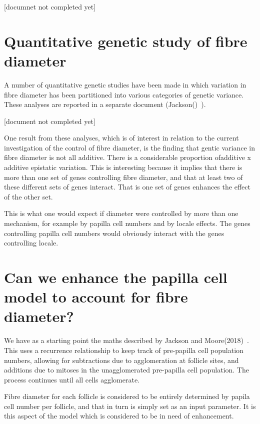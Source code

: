 \documentclass[titlepage]{article}  %
\begin{document}
[documnet not completed yet]


\section{Quantitative genetic study of fibre diameter}
A number of quantitative genetic studies have been made in which variation in fibre diameter has been partitioned into various categories of genetic variance.   These analyses are reported in a separate document (Jackson()~\cite{}).

[document not completed yet]

One result from these analyses, which is of interest in relation to the current investigation of the control of fibre diameter, is the finding that gentic variance in fibre diameter is not all additive. There is a considerable proportion ofadditive x additive epistatic variation. This is interesting because  it implies that there is more than one set of genes controlling fibre diameter, and that at least two of these different sets of genes interact. That is one set of genes enhances the effect of the other set.  

This is what one would expect if diameter were controlled by more than one mechanism, for example by papilla cell numbers and by locale effects. The genes controlling papilla cell numbers would obviously interact with the genes controlling locale.

\section{Can we enhance the papilla cell model to account for fibre diameter?}
We have as a starting point the maths described by Jackson and Moore(2018)~\cite{jack:18}. This uses a recurrence relationship to keep track of pre-papilla cell population numbers, allowing for subtractions due to agglomeration at follicle sites, and additions due to mitoses in the unagglomerated pre-papilla cell population. The process continues until all cells agglomerate.

Fibre diameter for each follicle is considered to be entirely determined by papila cell number per follicle, and that in turn is simply set as an input parameter. It is this aspect of the model which is considered to be in need of enhancement.
\end{document}
